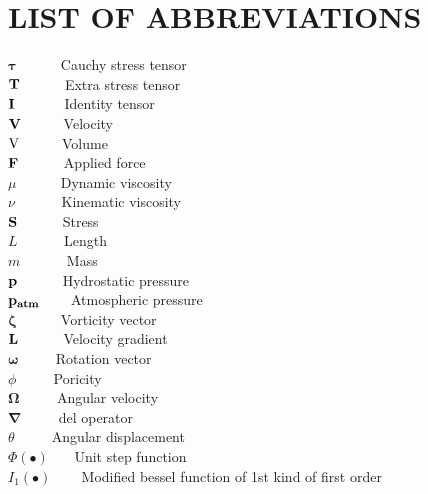 
\chapter*{LIST OF ABBREVIATIONS}
\def\ds{\displaystyle\mathstrut}
\def\baselinestretch{1.65}


$\boldsymbol \tau \,\,\,\,\,\,\,\,\,\,\,\,\,\,\,\,\,\,\,$Cauchy stress tensor\\
${\bf{T}}\,\,\,\,\,\,\,\,\,\,\,\,\,\,\,\,\,\,\,$Extra stress tensor\\
${\bf{I}}\,\,\,\,\,\,\,\,\,\,\,\,\,\,\,\,\,\,\,\,\,$Identity tensor\\
${\bf{V}}\,\,\,\,\,\,\,\,\,\,\,\,\,\,\,\,\,\,$Velocity\\
${\rm{V}}\,\,\,\,\,\,\,\,\,\,\,\,\,\,\,\,\,\,$Volume\\
${\bf{F}}\,\,\,\,\,\,\,\,\,\,\,\,\,\,\,\,\,\,\,$Applied force\\
$\mu \,\,\,\,\,\,\,\,\,\,\,\,\,\,\,\,\,\,\,$Dynamic viscosity\\
$\nu \,\,\,\,\,\,\,\,\,\,\,\,\,\,\,\,\,\,\,\,$Kinematic viscosity\\
${\bf{S}}\,\,\,\,\,\,\,\,\,\,\,\,\,\,\,\,\,\,\,$Stress\\
$L\,\,\,\,\,\,\,\,\,\,\,\,\,\,\,\,\,\,\,\,$Length\\
$m\,\,\,\,\,\,\,\,\,\,\,\,\,\,\,\,\,\,\,\,$Mass\\
${\bf{p}}\,\,\,\,\,\,\,\,\,\,\,\,\,\,\,\,\,\,\,$Hydrostatic pressure\\
${\bf{p_{atm}}}\,\,\,\,\,\,\,\,\,\,\,\,\,$Atmospheric pressure\\
${\boldsymbol \zeta}\,\,\,\,\,\,\,\,\,\,\,\,\,\,\,\,\,\,\,$Vorticity vector\\
${\bf{L}}\,\,\,\,\,\,\,\,\,\,\,\,\,\,\,\,\,\,\,$Velocity gradient\\
${\boldsymbol \omega}\,\,\,\,\,\,\,\,\,\,\,\,\,\,\,\,$Rotation vector\\
${\phi}\,\,\,\,\,\,\,\,\,\,\,\,\,\,\,\,$Poricity\\
${\boldsymbol \Omega}\,\,\,\,\,\,\,\,\,\,\,\,\,\,\,\,$Angular velocity\\
${\boldsymbol \nabla}\,\,\,\,\,\,\,\,\,\,\,\,\,\,\,\,$del operator\\
${\theta}\,\,\,\,\,\,\,\,\,\,\,\,\,\,\,\,$Angular displacement\\
${\Phi(\bullet)}\,\,\,\,\,\,\,\,\,\,\,$Unit step function\\
${I_{1}(\bullet)}\,\,\,\,\,\,\,\,\,\,\,\,\,$Modified bessel function of 1st kind of first order\\
